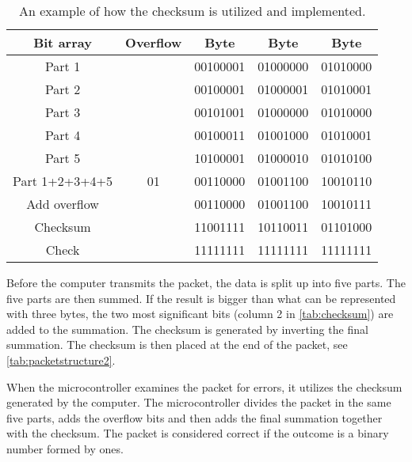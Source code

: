 \begin{table}[H]
    \centering
    \begin{tabular}{|c|c|c|c|c|}
        \hline
        Bit array      & Overflow   & Byte 	   & Byte 	  & Byte		 \\ \hline
        Part 1         & 		    & 00100001 & 01000000 & 01010000    \\ \hline
        Part 2         & 		    & 00100001 & 01000001 & 01010001    \\ \hline
        Part 3         & 		    & 00101001 & 01000000 & 01010000    \\ \hline
        Part 4         & 		    & 00100011 & 01001000 & 01010001    \\ \hline
        Part 5         & 		    & 10100001 & 01000010 & 01010100    \\ \hline
        Part 1+2+3+4+5 & 01	        & 00110000 & 01001100 & 10010110 	 \\ \hline
        Add overflow   & 		    & 00110000 & 01001100 & 10010111    \\ \hline
        Checksum       & 		    & 11001111 & 10110011 & 01101000    \\ \hline
        Check          & 		    & 11111111 & 11111111 & 11111111    \\ \hline
    \end{tabular}
    \caption{An example of how the checksum is utilized and implemented.}
    \label{tab:checksum}
\end{table}

Before the computer transmits the packet, the data is split up into five parts. The five parts are then summed. If the result is bigger than what can be represented with three bytes, the two most significant bits (column 2 in \autoref{tab:checksum}) are added to the summation. The checksum is generated by inverting the final summation. The checksum is then placed at the end of the packet, see \autoref{tab:packetstructure2}.

When the microcontroller examines the packet for errors, it utilizes the checksum generated by the computer. The microcontroller divides the packet in the same five parts, adds the overflow bits and then adds the final summation together with the checksum. The packet is considered correct if the outcome is a binary number formed by ones.

